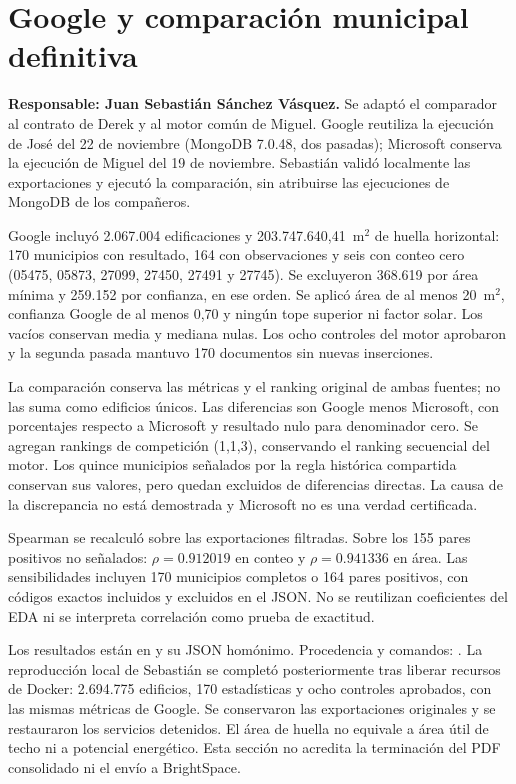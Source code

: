 \section{Google y comparación municipal definitiva}
\textbf{Responsable: Juan Sebastián Sánchez Vásquez.}
Se adaptó el comparador al contrato de Derek y al motor común de Miguel.
Google reutiliza la ejecución de José del 22 de noviembre (MongoDB 7.0.48,
dos pasadas); Microsoft conserva la ejecución de Miguel del 19 de noviembre.
Sebastián validó localmente las exportaciones y ejecutó la comparación, sin
atribuirse las ejecuciones de MongoDB de los compañeros.

Google incluyó 2.067.004 edificaciones y 203.747.640,41~m$^2$ de huella horizontal:
170 municipios con resultado, 164 con observaciones y seis con conteo cero
(05475, 05873, 27099, 27450, 27491 y 27745). Se excluyeron 368.619 por
área mínima y 259.152 por confianza, en ese orden. Se aplicó área de al menos
20~m$^2$, confianza Google de al menos 0,70 y ningún tope superior ni factor
solar. Los vacíos conservan media y mediana nulas. Los ocho controles del
motor aprobaron y la segunda pasada mantuvo 170 documentos sin nuevas inserciones.

La comparación conserva las métricas y el ranking original de ambas fuentes;
no las suma como edificios únicos. Las diferencias son Google menos Microsoft,
con porcentajes respecto a Microsoft y resultado nulo para denominador cero.
Se agregan rankings de competición (1,1,3), conservando el ranking secuencial
del motor. Los quince municipios señalados por la regla histórica compartida
conservan sus valores, pero quedan excluidos de diferencias directas. La causa
de la discrepancia no está demostrada y Microsoft no es una verdad certificada.

Spearman se recalculó sobre las exportaciones filtradas. Sobre los 155 pares
positivos no señalados: $\rho=0.912019$ en conteo y $\rho=0.941336$ en área.
Las sensibilidades incluyen 170 municipios completos o 164 pares positivos,
con códigos exactos incluidos y excluidos en el JSON. No se reutilizan coeficientes
del EDA ni se interpreta correlación como prueba de exactitud.

Los resultados están en 
y su JSON homónimo. Procedencia y comandos:
.
La reproducción local de Sebastián se completó posteriormente tras liberar
recursos de Docker: 2.694.775 edificios, 170 estadísticas y ocho controles
aprobados, con las mismas métricas de Google. Se conservaron las exportaciones
originales y se restauraron los servicios detenidos. El área de huella no equivale a área útil de techo
ni a potencial energético. Esta sección no acredita la terminación del PDF
consolidado ni el envío a BrightSpace.
